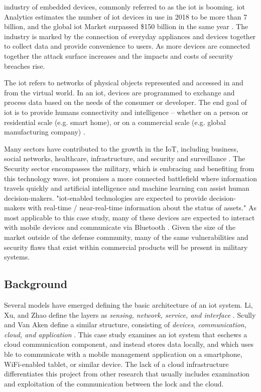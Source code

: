 \documentclass[conference]{IEEEtran}
\begin{document}
 industry of embedded devices, commonly referred to as the \gls{iot} is booming. \gls{iot} Analytics estimates the number of \gls{iot} devices in use in 2018 to be more than 7 billion, and the global \gls{iot} Market surpassed \$150 billion in the same year \cite{Scully2017}. The industry is marked by the connection of everyday appliances and devices together to collect data and provide convenience to users. As more devices are connected together the attack surface increases and the impacts and costs of security breaches rise.

\bigskip

The \gls{iot} refers to networks of physical objects represented and accessed in and from the virtual world. In an \gls{iot}, devices are programmed to exchange and process data based on the needs of the consumer or developer. The end goal of \gls{iot} is to provide humans connectivity and intelligence -- whether on a person or residential scale (e.g. smart home), or on a commercial scale (e.g. global manufacturing company) \cite{Li2015}. 

\bigskip

Many sectors have contributed to the growth in the IoT, including business, social networks, healthcare, infrastructure, and security and surveillance \cite{Li2015}. The Security sector encompasses the military, which is embracing and benefiting from this technology wave. \gls{iot} promises a more connected battlefield where information travels quickly and artificial intelligence and machine learning can assist human decision-makers. "\gls{iot}-enabled technologies are expected to provide decision-makers with real-time / near-real-time information about the status of assets." As most applicable to this case study, many of these devices are expected to interact with mobile devices and communicate via Bluetooth  \cite{Miller}. Given the size of the market outside of the defense community, many of the same vulnerabilities and security flaws that exist within commercial products will be present in military systems. 

\subsection{Background}

Several models have emerged defining the basic architecture of an \gls{iot} system. Li, Xu, and Zhao define the layers as \textit{sensing, network, service, and interface} \cite{Li2015}. Scully and Van Aken define a similar structure, consisting of \textit{devices, communication, cloud, and application}  \cite{Scully2017}. This case study examines an \gls{iot} system that eschews a cloud communication component, and instead stores data locally, and which uses \gls{ble} to communicate with a mobile management application on a smartphone, WiFi-enabled tablet, or similar device.  The lack of a cloud infrastructure differentiates this project from other research that usually includes examination and exploitation of the communication between the lock and the cloud. 
\end{document}
